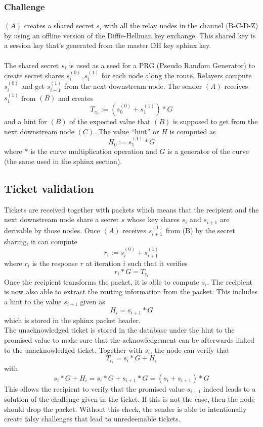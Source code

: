     \subsubsection{Challenge}
$(A)$ creates a shared secret $s_i$ with all the relay nodes in the channel (B-C-D-Z) by using an offline version of the Diffie-Hellman key exchange. This shared key is a session key that's generated from the master DH key sphinx key.
    \\~\\ The shared secret $s_i$ is used as a seed for a PRG (Pseudo Random Generator) to create secret shares $s_i^{(0)},s_i^{(1)}$ for each node along the route.
    Relayers compute $s_i^{(0)}$ and get $s_{i+1}^{(1)}$ from the next downstream node.
    \newline The sender $(A)$ receives $s_{1}^{(1)}$ from $(B)$ and creates $$T_{c_0}:=(s_0^{(0)}+s_{1}^{(1)})*G$$ and a hint for $(B)$ of the expected value that $(B)$ is supposed to get from the next downstream node $(C)$.
The value “hint” or $H$ is computed as $$H_0:=s_{1}^{(1)}*G$$ where $*$ is the curve multiplication operation and $G$ is a generator of the curve (the same used in the sphinx section).


\subsection{Ticket validation}
Tickets are received together with packets which means that the recipient and the next downstream node share a secret $s$ whose key shares $s_i$ and $s_{i+1}$ are derivable by those nodes.
\newline Once $(A)$ receives $s_{i+1}^{(1)}$ from (B) by the secret sharing, it can compute $$r_i:=s_i^{(0)}+s_{i+1}^{(1)}$$ where $r_i$ is the response $r$ at iteration $i$ such that it verifies
$$r_i*G=T_{c_i}$$
Once the recipient transforms the packet, it is able to compute $s_i$. The recipient is now also able to extract the routing information from the packet.
This includes a hint to the value $s_{i+1}$ given as $$H_i=s_{i+1}*G$$ which is stored in the sphinx packet header.
\\The unacknowledged ticket is stored in the database under the hint to the promised value to make sure that the acknowledgement can be afterwards linked to the unacknowledged ticket.
\newline Together with $s_i$, the node can verify that $$T_{c_i}=s_i*G+H_i$$ with $$s_i*G+H_i=s_i*G+s_{i+1}*G=(s_i+s_{i+1})*G$$
This allows the recipient to verify that the promised value $s_{i+1}$ indeed leads to a solution of the challenge given in the ticket.
If this is not the case, then the node should drop the packet.
\newline Without this check, the sender is able to intentionally create falsy challenges that lead to unredeemable tickets.


